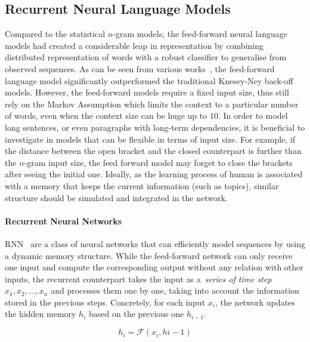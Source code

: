 \subsection{Recurrent Neural Language Models}

Compared to the statistical $n$-gram models, the feed-forward neural language models had created a considerable leap in representation by combining distributed representation of words with a robust classifier to generalise from observed sequences. As can be seen from various works~\cite{schwenk2007continuous,le2011structured}, the feed-forward language model significantly outperformed the traditional Knesey-Ney back-off models. However, the feed-forward models require a fixed input size, thus still rely on the Markov Assumption which limits the context to a particular number of words, even when the context size can be huge up to $10$. In order to model long sentences, or even paragraphs with long-term dependencies, it is beneficial to investigate in models that can be flexible in terms of input size. For example, if the distance between the open bracket and the closed counterpart is further than the $n$-gram input size, the feed forward model may forget to close the brackets after seeing the initial one. Ideally, as the learning process of human is associated with a memory that keeps the current information (such as topics), similar structure should be simulated and integrated in the network.

\paragraph{Recurrent Neural Networks} RNN~\cite{elman1990finding} are a class of neural networks that can efficiently model sequences by using a dynamic memory structure. While the feed-forward network can only receive one input and compute the corresponding output without any relation with other inputs, the recurrent counterpart takes the input as a~\textit{series of time step}  $x_1, x_2, \dots, x_n$ and processes them one by one, taking into account the information stored in the previous steps. Concretely, for each input $x_i$, the network updates the hidden memory $h_i$ based on the previous one $h_{i-1}$. 


\begin{equation}
h_i = \mathcal{F}(x_i, h{i-1})
\end{equation}

